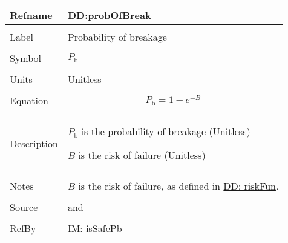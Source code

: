 \documentclass[12pt]{article}
\begin{document}
\vspace{\baselineskip}
\noindent
\begin{minipage}{\textwidth}
\begin{tabular}{>{\raggedright}p{}>{\raggedright\arraybackslash}p{}}
\toprule \textbf{Refname} & \textbf{DD:probOfBreak}
\label{DD:probOfBreak}
\\ \midrule \\
Label & Probability of breakage
        
\\ \midrule \\
Symbol & ${P_{\text{b}}}$
         
\\ \midrule \\
Units & Unitless
        
\\ \midrule \\
Equation & \begin{displaymath}
           {P_{\text{b}}}=1-e^{-B}
           \end{displaymath}
\\ \midrule \\
Description & \begin{symbDescription}
              \item{${P_{\text{b}}}$ is the probability of breakage (Unitless)}
              \item{$B$ is the risk of failure (Unitless)}
              \end{symbDescription}
\\ \midrule \\
Notes & $B$ is the risk of failure, as defined in \hyperref[DD:riskFun]{DD: riskFun}.
        
\\ \midrule \\
Source & \cite{astm2009} and \cite{beasonEtAl1998}
         
\\ \midrule \\
RefBy & \hyperref[IM:isSafePb]{IM: isSafePb}
        
\\ \bottomrule
\end{tabular}
\end{minipage}
\end{document}

